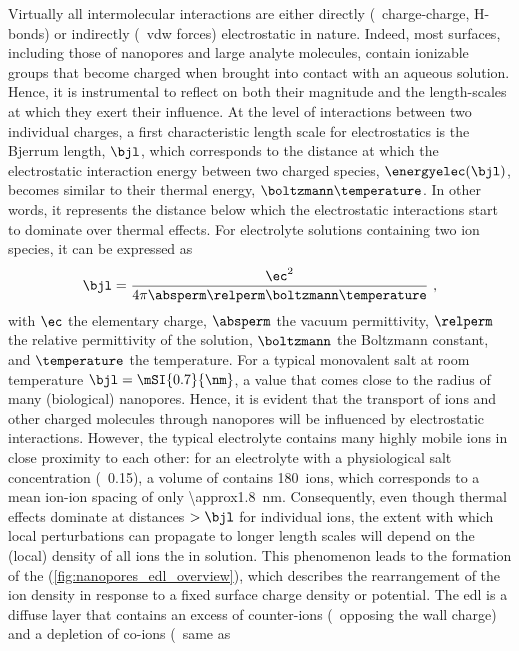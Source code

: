 Virtually all intermolecular interactions are either directly (\eg~charge-charge, H-bonds) or indirectly
(\eg~\gls{vdw} forces) electrostatic in nature. Indeed, most surfaces, including those of nanopores and large
analyte molecules, contain ionizable groups that become charged when brought into contact with an aqueous
solution. Hence, it is instrumental to reflect on both their magnitude and the length-scales at which they
exert their influence. At the level of interactions between two individual charges, a first characteristic
length scale for electrostatics is the Bjerrum length, $\bjl$, which corresponds to the distance at which the
electrostatic interaction energy between two charged species, $\energyelec (\bjl)$, becomes similar to their
thermal energy, $\boltzmann \temperature$. In other words, it represents the distance below which the
electrostatic interactions start to dominate over thermal effects. For electrolyte solutions containing two
ion species, it can be expressed as~\cite{Bocquet-2010}
%
\begin{equation}\label{eq:nanopores_bjerrum_length}
  \bjl = \dfrac{\ec^2}{4 \pi \absperm \relperm \boltzmann \temperature}
  \text{ ,}
\end{equation}
%
with $\ec$ the elementary charge, $\absperm$ the vacuum permittivity, $\relperm$ the relative permittivity of
the solution, $\boltzmann$ the Boltzmann constant, and $\temperature$ the temperature. For a typical
monovalent salt at room temperature $\bjl = \mSI{0.7}{\nm}$, a value that comes close to the radius of many
(biological) nanopores. Hence, it is evident that the transport of ions and other charged molecules through
nanopores will be influenced by electrostatic interactions. However, the typical electrolyte contains many
highly mobile ions in close proximity to each other: for an electrolyte with a physiological salt
concentration (\eg~\SI{0.15}{\Molar}), a volume of  contains 180~ions, which
corresponds to a mean ion-ion spacing of only \SI{\approx1.8}{\nm}. Consequently, even though thermal effects
dominate at distances $>\bjl$ for individual ions, the extent with which local perturbations can propagate to
longer length scales will depend on the (local) density of all ions the in solution. This phenomenon leads to
the formation of the  (\cref{fig:nanopores_edl_overview}), which describes the rearrangement of
the ion density in response to a fixed surface charge density or potential. The \gls{edl} is a diffuse layer
that contains an excess of counter-ions (\ie~opposing the wall charge) and a depletion of co-ions (\ie~same as
